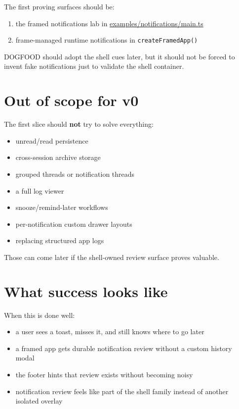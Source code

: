 The first proving surfaces should be:

\begin{enumerate}
\def\labelenumi{\arabic{enumi}.}
\tightlist
\item
  the framed notifications lab in \href{https://github.com/flyingrobots/bijou/blob/cbd70612140e7a450d764b3c7be1c6af878b99bc/examples/notifications/main.ts}{examples/notifications/main.ts}
\item
  frame-managed runtime notifications in \texttt{c\allowbreak{}r\allowbreak{}e\allowbreak{}a\allowbreak{}t\allowbreak{}e\allowbreak{}F\allowbreak{}r\allowbreak{}a\allowbreak{}m\allowbreak{}e\allowbreak{}d\allowbreak{}A\allowbreak{}p\allowbreak{}p\allowbreak{}(\allowbreak{})}
\end{enumerate}

DOGFOOD should adopt the shell cues later, but it should not be forced to invent fake notifications just to validate the shell container.

\section{Out of scope for v0}\label{record-053-out-of-scope-for-v0}

The first slice should \textbf{not} try to solve everything:

\begin{itemize}
\tightlist
\item
  unread/read persistence
\item
  cross-session archive storage
\item
  grouped threads or notification threads
\item
  a full log viewer
\item
  snooze/remind-later workflows
\item
  per-notification custom drawer layouts
\item
  replacing structured app logs
\end{itemize}

Those can come later if the shell-owned review surface proves valuable.

\section{What success looks like}\label{record-053-what-success-looks-like}

When this is done well:

\begin{itemize}
\tightlist
\item
  a user sees a toast, misses it, and still knows where to go later
\item
  a framed app gets durable notification review without a custom history modal
\item
  the footer hints that review exists without becoming noisy
\item
  notification review feels like part of the shell family instead of another isolated overlay
\end{itemize}

